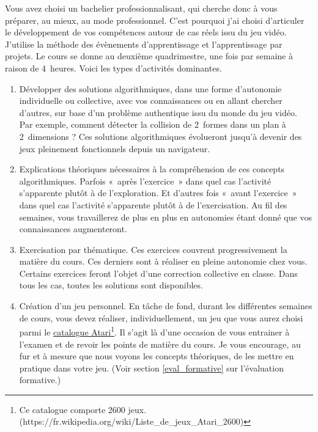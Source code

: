 Vous avez choisi un bachelier professionnalisant, qui cherche donc à vous préparer, au mieux, au mode professionnel. C’est  pourquoi j’ai choisi d’articuler le développement de vos compétences autour de cas réels issu du jeu vidéo. J'utilise la méthode des évènements d’apprentissage\cite{Leclercqevenements} et l'apprentissage par projets\cite{proulx2004apprentissage}.
Le cours se donne au deuxième quadrimestre, une fois par semaine à raison de 4~heures. Voici les types d'activités dominantes.
\begin{enumerate}
    \item Développer des solutions algorithmiques, dans une forme d’autonomie individuelle ou collective, avec vos connaissances ou en allant chercher d’autres, sur base d’un problème authentique issu du monde du jeu vidéo. Par exemple, comment détecter la collision de 2~formes dans un plan à 2~dimensions ? Ces solutions algorithmiques évolueront jusqu'à devenir des jeux pleinement fonctionnels depuis un navigateur.
    \item Explications théoriques nécessaires à la compréhension de ces concepts algorithmiques. Parfois «~après l’exercice~» dans quel cas l’activité s’apparente plutôt à de l’exploration. Et d’autres fois «~avant l’exercice~» dans quel cas l’activité s’apparente plutôt à de l’exercisation. Au fil des semaines, vous travaillerez de plus en plus en autonomies étant donné que vos connaissances augmenteront.
    \item Exercisation par thématique. Ces exercices couvrent progressivement la matière du cours. Ces derniers sont à réaliser en pleine autonomie chez vous. Certains exercices feront l'objet d'une correction collective en classe. Dans tous les cas, toutes les solutions sont disponibles.
    \item Création d'un jeu personnel. En tâche de fond, durant les différentes semaines de cours, vous devez réaliser, individuellement, un jeu que vous aurez choisi parmi le \href{https://fr.wikipedia.org/wiki/Liste_de_jeux_Atari_2600}{catalogue Atari}\footnote{Ce catalogue comporte 2600 jeux.(https://fr.wikipedia.org/wiki/Liste\_de\_jeux\_Atari\_2600)}. Il s’agit là d’une occasion de vous entrainer à l’examen et de revoir les points de matière du cours. Je vous encourage, au fur et à mesure que nous voyons les concepts théoriques, de les mettre en pratique dans votre jeu. (Voir section \ref{eval_formative} sur l'évaluation formative.)
\end{enumerate}

\clearpage
